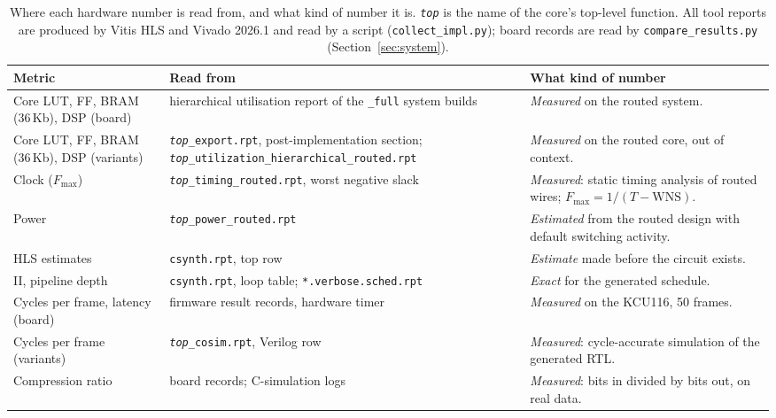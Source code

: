 \begin{table}[htbp]
\centering
\caption[Where each hardware number comes from]{Where each hardware number is
read from, and what kind of number it is. \texttt{\emph{top}} is the name of
the core's top-level function. All tool reports are produced by Vitis HLS and
Vivado 2026.1 and read by a script (\texttt{collect\_impl.py}); board records
are read by \texttt{compare\_results.py} (Section~\ref{sec:system}).}
\label{tab:hw_sources}
\small
\begin{tabular}{@{}>{\raggedright}p{}>{\raggedright}p{}>{\raggedright\arraybackslash}p{}@{}}
\toprule
Metric & Read from & What kind of number\\
\midrule
Core LUT, FF, BRAM (36\,Kb), DSP (board) & hierarchical utilisation report of the
\texttt{\_full} system builds &
\emph{Measured} on the routed system.\\
Core LUT, FF, BRAM (36\,Kb), DSP (variants) & \texttt{\emph{top}\_export.rpt},
post-implementation section; \texttt{\emph{top}\_utilization\_\allowbreak hierarchical\_\allowbreak routed.rpt} &
\emph{Measured} on the routed core, out of context.\\
Clock ($F_{\max}$) & \texttt{\emph{top}\_timing\_\allowbreak routed.rpt}, worst negative slack &
\emph{Measured}: static timing analysis of routed wires; $F_{\max} = 1/(T - \mathrm{WNS})$.\\
Power & \texttt{\emph{top}\_power\_\allowbreak routed.rpt} &
\emph{Estimated} from the routed design with default switching activity.\\
HLS estimates & \texttt{csynth.rpt}, top row &
\emph{Estimate} made before the circuit exists.\\
II, pipeline depth & \texttt{csynth.rpt}, loop table; \texttt{*.verbose.sched.rpt} &
\emph{Exact} for the generated schedule.\\
Cycles per frame, latency (board) & firmware result records, hardware timer &
\emph{Measured} on the KCU116, 50 frames.\\
Cycles per frame (variants) & \texttt{\emph{top}\_cosim.rpt}, Verilog row &
\emph{Measured}: cycle-accurate simulation of the generated RTL.\\
Compression ratio & board records; C-simulation logs &
\emph{Measured}: bits in divided by bits out, on real data.\\
\bottomrule
\end{tabular}
\end{table}

